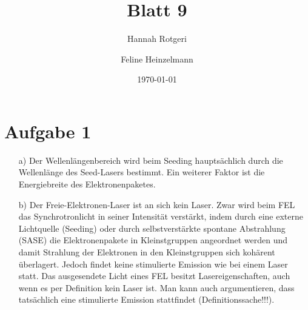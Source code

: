 \documentclass[11pt,a4paper]{article}
\title{Blatt 9}
\date{\today}
\author{Hannah Rotgeri \and Feline Heinzelmann}
\begin{document}
    \maketitle

    \section*{Aufgabe 1}
	\begin{itemize}
		\item[a)] 
			Der Wellenlängenbereich wird beim Seeding hauptsächlich durch die Wellenlänge des Seed-Lasers bestimmt. Ein weiterer Faktor ist die Energiebreite des Elektronenpaketes.
		\item[b)]
			Der Freie-Elektronen-Laser ist an sich kein Laser. Zwar wird beim FEL das Synchrotronlicht in seiner Intensität verstärkt, indem durch eine 
			externe Lichtquelle (Seeding) oder durch selbstverstärkte spontane Abstrahlung (SASE) die Elektronenpakete in Kleinstgruppen angeordnet werden
			und damit Strahlung der Elektronen in den Kleinstgruppen sich kohärent überlagert. Jedoch findet keine stimulierte Emission wie bei einem Laser statt.
			Das ausgesendete Licht eines FEL besitzt Lasereigenschaften, auch wenn es per Definition kein Laser ist. Man kann auch argumentieren, dass tatsächlich eine stimulierte Emission stattfindet
			(Definitionssache!!!).

	\end{itemize}


	
\end{document}
